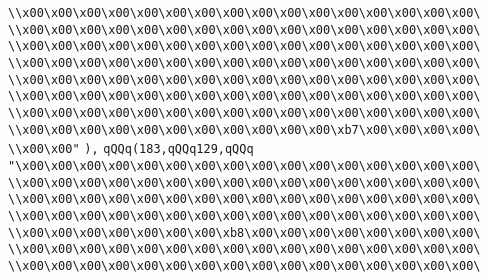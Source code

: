 \verb|\\x00\x00\x00\x00\x00\x00\x00\x00\x00\x00\x00\x00\x00\x00\x00\x00\|\newline
\verb|\\x00\x00\x00\x00\x00\x00\x00\x00\x00\x00\x00\x00\x00\x00\x00\x00\|\newline
\verb|\\x00\x00\x00\x00\x00\x00\x00\x00\x00\x00\x00\x00\x00\x00\x00\x00\|\newline
\verb|\\x00\x00\x00\x00\x00\x00\x00\x00\x00\x00\x00\x00\x00\x00\x00\x00\|\newline
\verb|\\x00\x00\x00\x00\x00\x00\x00\x00\x00\x00\x00\x00\x00\x00\x00\x00\|\newline
\verb|\\x00\x00\x00\x00\x00\x00\x00\x00\x00\x00\x00\x00\x00\x00\x00\x00\|\newline
\verb|\\x00\x00\x00\x00\x00\x00\x00\x00\x00\x00\x00\x00\x00\x00\x00\x00\|\newline
\verb|\\x00\x00\x00\x00\x00\x00\x00\x00\x00\x00\x00\xb7\x00\x00\x00\x00\|\newline
\verb|\\x00\x00"|\newline
\verb|),|\newline
\verb|qQQq(183,qQQq129,qQQq|\newline
\verb|"\x00\x00\x00\x00\x00\x00\x00\x00\x00\x00\x00\x00\x00\x00\x00\x00\|\newline
\verb|\\x00\x00\x00\x00\x00\x00\x00\x00\x00\x00\x00\x00\x00\x00\x00\x00\|\newline
\verb|\\x00\x00\x00\x00\x00\x00\x00\x00\x00\x00\x00\x00\x00\x00\x00\x00\|\newline
\verb|\\x00\x00\x00\x00\x00\x00\x00\x00\x00\x00\x00\x00\x00\x00\x00\x00\|\newline
\verb|\\x00\x00\x00\x00\x00\x00\x00\xb8\x00\x00\x00\x00\x00\x00\x00\x00\|\newline
\verb|\\x00\x00\x00\x00\x00\x00\x00\x00\x00\x00\x00\x00\x00\x00\x00\x00\|\newline
\verb|\\x00\x00\x00\x00\x00\x00\x00\x00\x00\x00\x00\x00\x00\x00\x00\x00\|\newline
